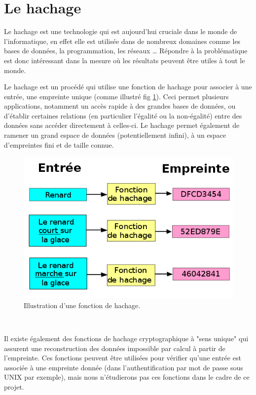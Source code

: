 \documentclass[final,twoside,article,10pt]{scrartcl}
\begin{document}
\section{Le hachage}
	Le hachage est une technologie qui est aujourd'hui cruciale dans le monde de l'informatique, en effet elle est utilisée dans de nombreux domaines comme les bases de données, la programmation, les réseaux \ldots\; Répondre à la problématique est donc intéressant dans la mesure où les résultats peuvent être utiles à tout le monde.\\
	\par Le hachage est un procédé qui utilise une fonction de hachage pour associer à une entrée, une empreinte unique (comme illustré fig \ref{fig:1}). Ceci permet plusieurs applications, notamment un accès rapide à des grandes bases de données, ou d'établir certaines relations (en particulier l'égalité ou la non-égalité) entre des données sans accéder directement à celles-ci. Le hachage permet également de ramener un grand espace de données (potentiellement infini), à un espace d'empreintes fini et de taille connue.\\
	\begin{figure}%
		\begin{center}
			\includegraphics[scale=0.3]{figures/hash}
		\end{center}
		\caption{Illustration d'une fonction de hachage.}
		\label{fig:1}
	\end{figure}\\
	\par Il existe également des fonctions de hachage cryptographique à "sens unique" qui assurent une reconstruction des données impossible par calcul à partir de l'empreinte. Ces fonctions peuvent être utilisées pour vérifier qu'une entrée est associée à une empreinte donnée (dans l'authentification par mot de passe sous UNIX par exemple), mais nous n'étudierons pas ces fonctions dans le cadre de ce projet.
	
\end{document}
